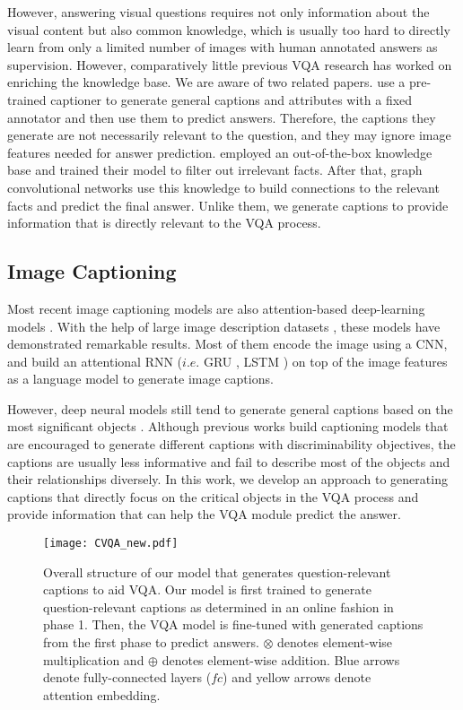 \documentclass[11pt,a4paper]{article}
\begin{document}
However, answering visual questions requires not only information about the visual content but also common knowledge, which is usually too hard to directly learn from only a limited number of images with human annotated answers as supervision. However, comparatively little previous VQA research has worked on enriching the knowledge base. We are aware of two related papers.  use a pre-trained captioner to generate general captions and attributes with a fixed annotator and then use them to predict answers. Therefore, the captions they generate are not necessarily relevant to the question, and they may ignore image features needed for answer prediction.  employed an out-of-the-box knowledge base and trained their model to filter out irrelevant facts. After that, graph convolutional networks use this knowledge to build connections to the relevant facts and predict the final answer. Unlike them, we generate captions to provide information that is directly relevant to the VQA process. 
\subsection{Image Captioning}
Most recent image captioning models are also attention-based deep-learning models  \cite{donahue2015long,karpathy2015deep,vinyals2015show,Luo_2018_CVPR,liu2018show}. With the help of large image description datasets \cite{chen2015microsoft}, these models have demonstrated remarkable results. Most of them encode the image using a CNN, and build an attentional RNN ($i.e.$ GRU \cite{cho2014learning}, LSTM \cite{hochreiter1997long}) on top of the image features as a language model to generate image captions. 

However, deep neural models still tend to generate general captions based on the most significant objects \cite{vijayakumar2016diverse}. Although previous works \cite{Luo_2018_CVPR,liu2018show} build captioning models that are encouraged to generate different captions with discriminability objectives, the captions are usually less informative and fail to describe most of the objects and their relationships diversely. In this work, we develop an approach to generating captions that directly focus on the critical objects in the VQA process and provide information that can help the VQA module predict the answer.
\begin{figure*}[!t]
\centering
\texttt{[image: CVQA\_new.pdf]}
\caption{Overall structure of our model that generates question-relevant captions to aid VQA. Our model is first trained to generate question-relevant captions as determined in an online fashion in phase 1. Then, the VQA model is fine-tuned with generated captions from the first phase to predict answers. 
$\otimes$ denotes element-wise multiplication and $\oplus$ denotes element-wise addition. Blue arrows denote fully-connected layers ($fc$) and yellow arrows denote attention embedding.}
\label{fig:overall_structure}
\end{figure*}
\end{document}
